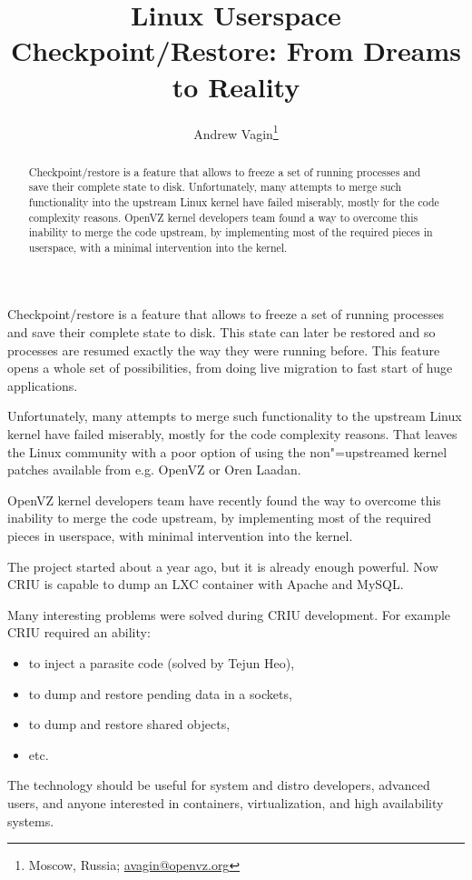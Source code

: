 \documentclass[10pt, a5paper]{article}
\begin{document}
\title{Linux Userspace Checkpoint/Restore: From Dreams to Reality}%

\author{Andrew Vagin\footnote{Moscow, Russia; \url{avagin@openvz.org}}}
\maketitle

\begin{abstract}
Checkpoint/restore is a feature that allows to freeze a set of running processes and save their complete state to disk. Unfortunately, many attempts to merge such functionality into the upstream Linux kernel have failed miserably, mostly for the code complexity reasons. OpenVZ kernel developers team found a way to overcome this inability to merge the code upstream, by implementing most of the required pieces in userspace, with a minimal intervention into the kernel.
\end{abstract}

Checkpoint/restore is a feature that allows to freeze a set of running processes and save their complete state to disk. This state can later be restored and so processes are resumed exactly the way they were running before. This feature opens a whole set of possibilities, from doing live migration to fast start of huge applications.

Unfortunately, many attempts to merge such functionality to the upstream Linux kernel have failed miserably, mostly for the code complexity reasons. That leaves the Linux community with a poor option of using the non"=upstreamed kernel patches available from e.g. OpenVZ or Oren Laadan.

OpenVZ kernel developers team have recently found the way to overcome this inability to merge the code upstream, by implementing most of the required pieces in userspace, with minimal intervention into the kernel.

The project started about a year ago, but it is already enough powerful. Now CRIU is capable to dump an LXC container with Apache and MySQL.

Many interesting problems were solved during CRIU development.
For example CRIU required an ability:

\begin{itemize}
  \item to inject a parasite code (solved by Tejun Heo),
  \item to dump and restore pending data in a sockets,
  \item to dump and restore shared objects,
  \item etc.
\end{itemize}

The technology should be useful for system and distro developers, advanced users, and anyone interested in containers, virtualization, and high availability systems.
\end{document}
